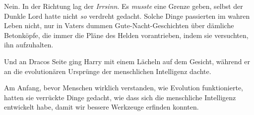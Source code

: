 Nein. In der Richtung lag der \emph{Irrsinn}. Es \emph{musste} eine Grenze geben, selbst der Dunkle Lord hatte nicht \emph{so} verdreht gedacht. Solche Dinge passierten im wahren Leben nicht, nur in Vaters dummen Gute-Nacht-Geschichten über dämliche Betonköpfe, die immer die Pläne des Helden vorantrieben, indem sie versuchten, ihn aufzuhalten.

\later

Und an Dracos Seite ging Harry mit einem Lächeln auf dem Gesicht, während er an die evolutionären Ursprünge der menschlichen Intelligenz dachte.

Am Anfang, bevor Menschen wirklich verstanden, wie Evolution funktionierte, hatten sie verrückte Dinge gedacht, wie dass sich die menschliche Intelligenz entwickelt habe, damit wir bessere Werkzeuge erfinden konnten.

